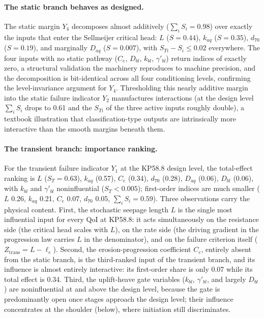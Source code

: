 \paragraph{The static branch behaves as designed.}
The static margin $Y_4$ decomposes almost additively ($\sum_i S_i = 0.98$)
over exactly the inputs that enter the Sellmeijer critical head: $L$
($S = 0.44$), $k_{aq}$ ($S = 0.35$), $d_{70}$ ($S = 0.19$), and marginally
$D_{aq}$ ($S = 0.007$), with $S_{Ti} - S_i \leq 0.02$ everywhere. The four
inputs with no static pathway ($C_e$, $D_{bl}$, $k_{bl}$,
$\gamma'_{bl}$) return indices of exactly zero, a structural validation
the machinery reproduces to machine precision, and the decomposition is
bit-identical across all four conditioning levels, confirming the
level-invariance argument for $Y_4$. Thresholding this nearly additive
margin into the static failure indicator $Y_2$ manufactures interactions
(at the design level $\sum_i S_i$ drops to 0.61 and the $S_{Ti}$ of the
three active inputs roughly double), a textbook illustration that
classification-type outputs are intrinsically more interactive than the
smooth margins beneath them.

\paragraph{The transient branch: importance ranking.}
For the transient failure indicator $Y_1$ at the KP58.8 design level, the
total-effect ranking is $L$ ($S_{T} = 0.63$), $k_{aq}$ (0.57), $C_e$
(0.34), $d_{70}$ (0.28), $D_{aq}$ (0.06), $D_{bl}$ (0.06), with $k_{bl}$
and $\gamma'_{bl}$ noninfluential ($S_T < 0.005$); first-order indices are
much smaller ($L$ 0.26, $k_{aq}$ 0.21, $C_e$ 0.07, $d_{70}$ 0.05,
$\sum_i S_i = 0.59$). Three observations carry the physical content.
First, the stochastic seepage length $L$ is the single most influential
input for every QoI at KP58.8: it acts simultaneously on the resistance
side (the critical head scales with $L$), on the rate side (the driving
gradient in the progression law carries $L$ in the denominator), and on
the failure criterion itself ($Z_{\mathrm{trans}} = L - \ell_e$). Second,
the erosion-progression coefficient $C_e$, entirely absent from the static
branch, is the third-ranked input of the transient branch, and its
influence is almost entirely interactive: its first-order share is only
0.07 while its total effect is 0.34. Third, the uplift-heave gate
variables ($k_{bl}$, $\gamma'_{bl}$, and largely $D_{bl}$) are
noninfluential at and above the design level, because the gate is
predominantly open once stages approach the design level; their influence
concentrates at the shoulder (below), where initiation still discriminates.

